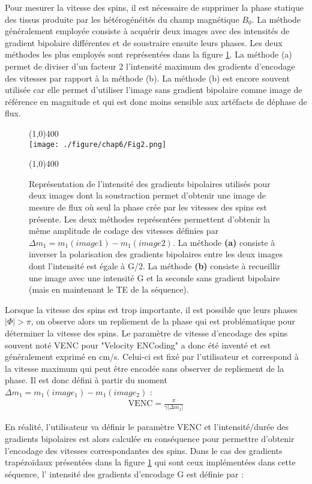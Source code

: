 Pour mesurer la vitesse des spins, il est nécessaire de supprimer la phase statique des tissus produite par les hétérogénéités du champ magnétique $B_0$. La méthode généralement employée consiste à acquérir deux images avec des intensités de gradient bipolaire différentes et de soustraire ensuite leurs phases. Les deux méthodes les plus employés sont représentées dans la figure \ref{fig:MethodeGradientBip}. La méthode (a) permet de diviser d'un facteur 2 l'intensité maximum des gradients d'encodage des vitesses par rapport à la méthode (b). La méthode (b) est encore souvent utilisée car elle permet d'utiliser l'image sans gradient bipolaire comme image de référence en magnitude et qui est donc moins sensible aux artéfacts de déphase de flux.
\begin{figure}[h]
\centering
\line(1,0){400} \\
\texttt{[image: ./figure/chap6/Fig2.png]}
\caption[Méthodes gradient bipolaire]{\label{fig:MethodeGradientBip} Représentation de l'intensité des gradients bipolaires utilisés pour deux images dont la soustraction permet d'obtenir une image de mesure de flux où seul la phase crée par les vitesses des spins est présente. Les deux méthodes représentées permettent d'obtenir la même amplitude de codage des vitesses définies par $\Delta m_1 = m_1(image1) - m_1(image2)$. La méthode \textbf{(a)} consiste à inverser la polarisation des gradients bipolaires entre les deux images dont l'intensité est égale à G/2. La méthode \textbf{(b)} consiste à recueillir une image avec une intensité G et la seconde sans gradient bipolaire (mais en maintenant le TE de la séquence). }
\line(1,0){400} \\ 
\end{figure}

Lorsque la vitesse des spins est trop importante, il est possible que leurs phases $| \Phi | > \pi$, on observe alors un repliement de la phase qui est problématique pour déterminer la vitesse des spins. Le paramètre de vitesse d'encodage des spins souvent noté VENC pour "Velocity ENCoding" a donc été inventé et est généralement exprimé en cm/s. Celui-ci est fixé par l'utilisateur et correspond à la vitesse maximum qui peut être encodée sans observer de repliement de la phase. Il est donc défini à partir du moment $\Delta m_1=m_1(image_1)-m_1(image_2)$ :
\begin{align}
\text{VENC} = \frac{\pi}{\gamma | \Delta m_1 |}
\end{align} 

En réalité, l'utilisateur va définir le paramètre VENC et l'intensité/durée des gradients bipolaires est alors calculée en conséquence pour permettre d'obtenir l'encodage des vitesses correspondantes des spins. Dans le cas des gradients trapézoïdaux présentées dans la figure \ref{fig:MethodeGradientBip} qui sont ceux implémentées dans cette séquence, l' intensité des gradients d'encodage G est définie par :

